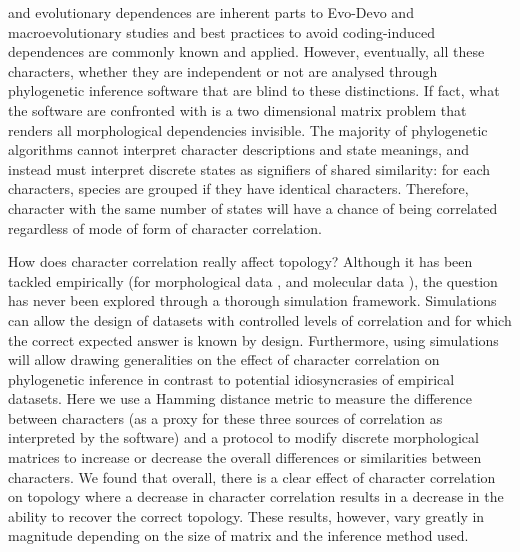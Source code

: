 \documentclass[12pt,letterpaper]{article}
\begin{document}
\color{black}{Intra-organismal} and evolutionary dependences are inherent parts to Evo-Devo and macroevolutionary studies and best practices to avoid coding-induced dependences are commonly known and applied.
However, eventually, all these characters, whether they are independent or not are analysed through phylogenetic inference software that are blind to these distinctions.
If fact, what the software are confronted with is a two dimensional matrix problem that renders all morphological dependencies invisible.
The majority of phylogenetic algorithms cannot interpret character descriptions and state meanings, and instead must interpret discrete states as signifiers of shared similarity: for each characters, species are grouped if they have identical characters.
Therefore, character with the same number of states will have a chance of being correlated regardless of mode of form of character correlation.

\noindent How does character correlation really affect topology?
Although it has been tackled empirically (for morphological data \citealt{Davalos01072014}, and molecular data \citealt{ZouConvergence}), the question has never been explored through a thorough simulation framework.
Simulations can allow the design of datasets with controlled levels of correlation and for which the correct expected answer is known by design.
Furthermore, using simulations will allow drawing generalities on the effect of character correlation on phylogenetic inference in contrast to potential idiosyncrasies of empirical datasets.
Here we use a Hamming distance metric to measure the difference between characters (as a proxy for these three sources of correlation as interpreted by the software) and a protocol to modify discrete morphological matrices to increase or decrease the overall differences or similarities between characters.
We found that overall, there is a clear effect of character correlation on topology where a decrease in character correlation results in a decrease in the ability to recover the correct topology.
These results, however, vary greatly in magnitude depending on the size of matrix and the inference method used.
\end{document}
